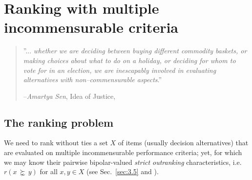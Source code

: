 \chapter{Ranking with multiple incommensurable criteria}
\label{sec:8}


\begin{quotation}''... \emph{whether we are deciding between buying different commodity baskets, or making choices about what to do on a holiday, or deciding for whom to vote for in an election, we are inescapably involved in evaluating alternatives with non–commensurable aspects}.''

  --\emph{Amartya Sen}, Idea of Justice, \citep{SEN-2009}
\end{quotation}
\vspace{1cm}


\section{The ranking problem}
\label{sec:8.1}

We need to rank without ties a set $X$ of items (usually decision alternatives) that are evaluated on multiple incommensurable performance criteria; yet, for which we may know their pairwise bipolar-valued \emph{strict outranking} characteristics, i.e. $r(x\, \succnsim \, y)$ for all $x, y \in X$ (see Sec.~\ref{sec:3.5} and \citep{BIS-2013}).

